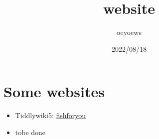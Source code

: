 \documentclass[UTF8,12pt,a4paper]{article}
\title{website}
\author{oeyoews}
\date{2022/08/18}
\begin{document}
\maketitle
\thispagestyle{empty}

\section*{Some websites}

\begin{itemize}
  \item Tiddlywiki5: \href{https://oeyoew.fun}{fishforyou}
  \item tobe done
\end{itemize}

\end{document}
